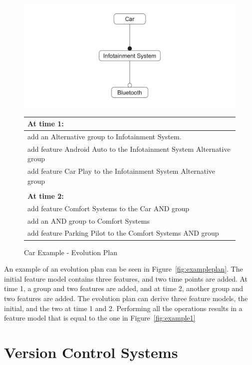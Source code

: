 \documentclass[a4paper,english]{ifimaster}
\begin{document}
\begin{figure}[htpb]
	\centering
	\includegraphics[width=0.8\linewidth]{illustrations/initial.pdf}
	\begin{tabular}{l}
		\textbf{At time 1:}                                           \\ \hline
		add an Alternative group to Infotainment System.                      \\
		add feature Android Auto to the Infotainment System Alternative group \\
		add feature Car Play to the Infotainment System Alternative group     \\
		\\
		\textbf{At time 2:}                                           \\ \hline
		add feature Comfort Systems to the Car AND group              \\
		add an AND group to Comfort Systems                           \\
		add feature Parking Pilot to the Comfort Systems AND group
	\end{tabular}
	\caption{Car Example - Evolution Plan}%
	\label{fig:exampleplan}
\end{figure}

An example of an evolution plan can be seen in Figure~\vref{fig:exampleplan}. The initial feature model contains three features, and two time points are added. At time 1, a group and two features are added, and at time 2, another group and two features are added. The evolution plan can derive three feature models, the initial, and the two at time 1 and 2. Performing all the operations results in a feature model that is equal to the one in Figure~\vref{fig:example1}

\section{Version Control Systems}%
\label{sec:version_control_systems}
\end{document}
